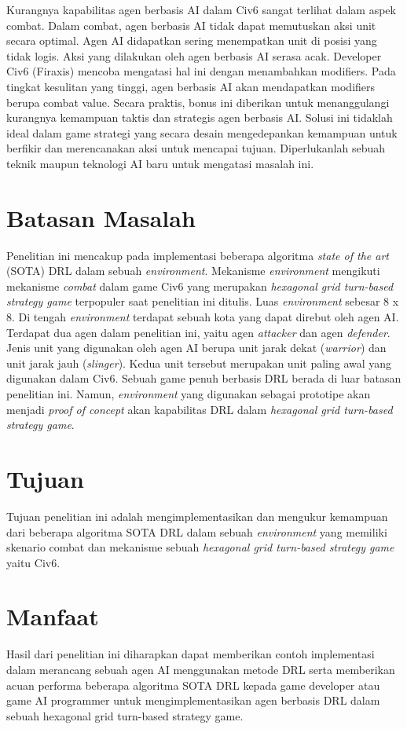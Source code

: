 Kurangnya kapabilitas agen berbasis AI dalam Civ6 sangat terlihat dalam aspek combat. Dalam combat, agen berbasis AI tidak dapat memutuskan aksi unit secara optimal. Agen AI didapatkan sering menempatkan unit di posisi yang tidak logis. 
Aksi yang dilakukan oleh agen berbasis AI serasa acak. 
Developer Civ6 (Firaxis) mencoba mengatasi hal ini dengan menambahkan modifiers. 
Pada tingkat kesulitan yang tinggi, agen berbasis AI akan mendapatkan modifiers berupa combat value. Secara praktis, bonus ini diberikan untuk menanggulangi kurangnya kemampuan taktis dan strategis agen berbasis AI. 
Solusi ini tidaklah ideal dalam game strategi yang secara desain mengedepankan kemampuan untuk berfikir dan merencanakan aksi untuk mencapai tujuan.
Diperlukanlah sebuah teknik maupun teknologi AI baru untuk mengatasi masalah ini.

\section{Batasan Masalah}
\label{sec:batasanmasalah}

Penelitian ini mencakup pada implementasi beberapa algoritma \emph{state of the art} (SOTA) DRL dalam sebuah \emph{environment}. 
Mekanisme \emph{environment} mengikuti mekanisme \emph{combat} dalam game Civ6 yang merupakan \emph{hexagonal grid turn-based strategy game} terpopuler saat penelitian ini ditulis. 
Luas \emph{environment} sebesar 8 x 8. Di tengah \emph{environment} terdapat sebuah kota yang dapat direbut oleh agen AI. Terdapat dua agen dalam penelitian ini, yaitu agen \emph{attacker} dan agen \emph{defender}. 
Jenis unit yang digunakan oleh agen AI berupa unit jarak dekat (\emph{warrior}) dan unit jarak jauh (\emph{slinger}). Kedua unit tersebut merupakan unit paling awal yang digunakan dalam Civ6.
Sebuah game penuh berbasis DRL berada di luar batasan penelitian ini. Namun, \emph{environment} yang digunakan sebagai prototipe akan menjadi \emph{proof of concept}
akan kapabilitas DRL dalam \emph{hexagonal grid turn-based strategy game}.

\section{Tujuan}
\label{sec:Tujuan}

Tujuan penelitian ini adalah mengimplementasikan dan mengukur kemampuan dari beberapa 
algoritma SOTA DRL dalam sebuah \emph{environment} yang memiliki skenario combat dan mekanisme
sebuah \emph{hexagonal grid turn-based strategy game} yaitu Civ6.

\section{Manfaat}
\label{sec:manfaat}

Hasil dari penelitian ini diharapkan dapat memberikan contoh implementasi dalam merancang 
sebuah agen AI menggunakan metode DRL serta memberikan acuan performa beberapa algoritma SOTA DRL kepada game developer atau game AI programmer untuk 
mengimplementasikan agen berbasis DRL dalam sebuah hexagonal grid turn-based strategy game.

